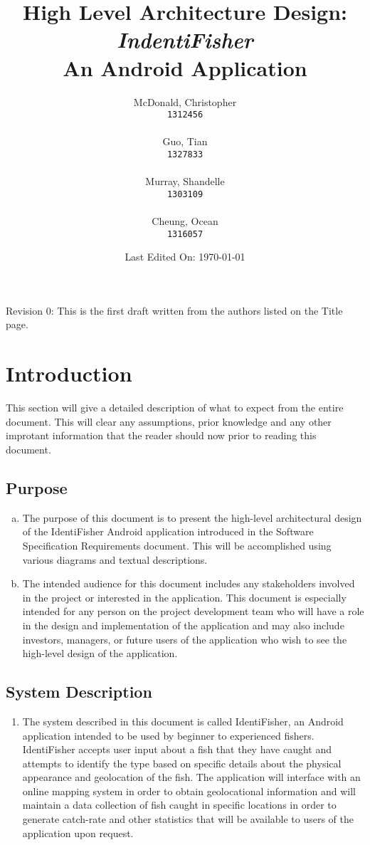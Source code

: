 \documentclass[]{article}
\title{High Level Architecture Design: \\ \textit{IndentiFisher} \\ An Android Application \\}
\author{
\Large McDonald, Christopher\\
\texttt{1312456} \\ \\
\Large Guo, Tian\\
\texttt{1327833} \\ \\
\Large Murray, Shandelle\\
\texttt{1303109} \\ \\
\Large Cheung, Ocean\\
\texttt{1316057} \\
}
\date{Last Edited On: \today}
\begin{document}
\maketitle

\newpage
\tableofcontents

\vfill
Revision 0: This is the first draft written from the authors listed on the Title page.
\pagebreak

\section{Introduction}
\label{sec:introduction}
This section will give a detailed description of what to expect from the entire document. This will clear any assumptions, prior knowledge and any other improtant information that the reader should now prior to reading this document.

\subsection{Purpose}
\label{sub:purpose}
\begin{enumerate}[a)]
	\item
	The purpose of this document is to present the high-level architectural design of the IdentiFisher Android application introduced in the Software Specification Requirements document. This will be accomplished using various diagrams and textual descriptions.
	\item 
	The intended audience for this document includes any stakeholders involved in the project or interested in the application. This document is especially intended for any person on the project development team who will have a role in the design and implementation of the application and may also include investors, managers, or future users of the application who wish to see the high-level design of the application.  
\end{enumerate}

\subsection{System Description}
\label{sub:system_description}
\begin{enumerate}[]
	\item 
	The system described in this document is called IdentiFisher, an Android application intended to be used by beginner to experienced fishers. IdentiFisher accepts user input about a fish that they have caught and attempts to identify the type based on specific details about the physical appearance and geolocation of the fish. The application will interface with an online mapping system in order to obtain geolocational information and will maintain a data collection of fish caught in specific locations in order to generate catch-rate and other statistics that will be available to users of the application upon request. 
\end{enumerate}
\end{document}
